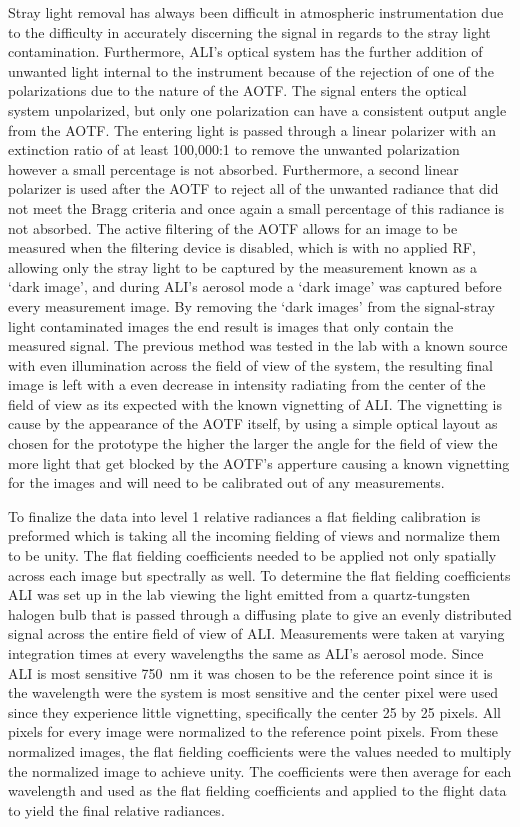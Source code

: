 \documentclass[12pt]{article}
\begin{document}
Stray light removal has always been difficult in atmospheric instrumentation due to the difficulty in accurately discerning the signal in regards to the stray light contamination. Furthermore, ALI's optical system has the further addition of unwanted light internal to the instrument because of the rejection of one of the polarizations due to the nature of the AOTF. The signal enters the optical system unpolarized, but only one polarization can have a consistent output angle from the AOTF. The entering light is passed through a linear polarizer with an extinction ratio of at least 100,000:1 to remove the unwanted polarization however a small percentage is not absorbed. Furthermore, a second linear polarizer is used after the AOTF to reject all of the unwanted radiance that did not meet the Bragg criteria and once again a small percentage of this radiance is not absorbed. The active filtering of the AOTF allows for an image to be measured when the filtering device is disabled, which is with no applied RF, allowing only the stray light to be captured by the measurement known as a `dark image', and during ALI's aerosol mode a `dark image' was captured before every measurement image. By removing the `dark images' from the signal-stray light contaminated images the end result is images that only contain the measured signal. The previous method was tested in the lab with a known source with even illumination across the field of view of the system, the resulting final image is left with a even decrease in intensity radiating from the center of the field of view as its expected with the known vignetting of ALI. The vignetting is cause by the appearance of the AOTF itself, by using a simple optical layout as chosen for the prototype the higher the larger the angle for the field of view the more light that get blocked by the AOTF's apperture causing a known vignetting for the images and will need to be calibrated out of any measurements.

To finalize the data into level 1 relative radiances a flat fielding calibration is preformed which is taking all the incoming fielding of views and normalize them to be unity. The flat fielding coefficients needed to be applied not only spatially across each image but spectrally as well. To determine the flat fielding coefficients ALI was set up in the lab viewing the light emitted from a quartz-tungsten halogen bulb that is passed through a diffusing plate to give an evenly distributed signal across the entire field of view of ALI. Measurements were taken at varying integration times at every wavelengths the same as ALI's aerosol mode. Since ALI is most sensitive 750~nm it was chosen to be the reference point since it is the wavelength were the system is most sensitive and the center pixel were used since they experience little vignetting, specifically the center 25 by 25 pixels. All pixels for every image were normalized to the reference point pixels. From these normalized images, the flat fielding coefficients were the values needed to multiply the normalized image to achieve unity. The coefficients were then average for each wavelength and used as the flat fielding coefficients and applied to the flight data to yield the final relative radiances.
\end{document}

